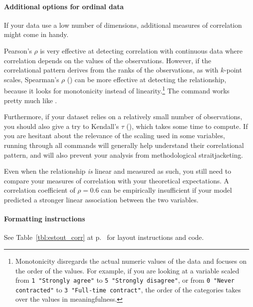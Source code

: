   \paragraph{Additional options for ordinal data} If your data use a low number of dimensions, additional measures of correlation might come in handy.

  Pearson's $\rho$ is very effective at detecting correlation with continuous data where correlation depends on the values of the observations. However, if the correlational pattern derives from the ranks of the observations, as with $k$-point scales, Spearman's $\rho$ () can be more effective at detecting the relationship, because it looks for monotonicity instead of linearity.\footnote{Monotonicity disregards the actual numeric values of the data and focuses on the order of the values. For example, if you are looking at a variable scaled from \texttt{1 "Strongly agree"} to \texttt{5 "Strongly disagree"}, or from \texttt{0 "Never contracted"} to \texttt{3 "Full-time contract"}, the order of the categories takes over the values in meaningfulness.} The command works pretty much like .

  Furthermore, if your dataset relies on a relatively small number of observations, you should also give a try to Kendall's $\tau$ (), which takes some time to compute. If you are hesitant about the relevance of the scaling used in some variables, running through all commands will generally help understand their correlational pattern, and will also prevent your analysis from methodological straitjacketing.

  Even when the relationship \emph{is} linear and measured as such, you still need to compare your measures of correlation with your theoretical expectations. A correlation coefficient of $\rho = 0.6$ can be empirically insufficient if your model predicted a stronger linear association between the two variables.

\paragraph{Formatting instructions} See Table~\ref{tbl:estout_corr} at p.~\pageref{tbl:estout_corr} for layout instructions and code.

